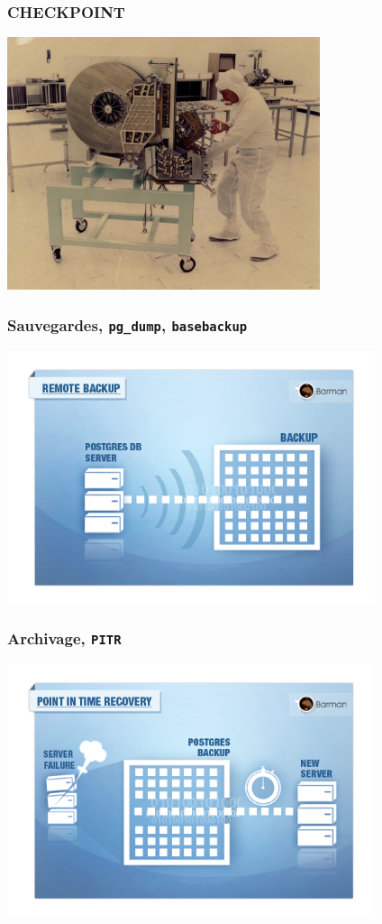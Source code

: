 \documentclass{beamer}
\begin{document}
\begin{frame}[fragile]
\begin{center}
  \frametitle{CHECKPOINT}
  \includegraphics[height=20em]{new_hard_drive.jpg}
\end{center}
\end{frame}

\begin{frame}[fragile]
\begin{center}
  \frametitle{Sauvegardes, \texttt{pg\_dump}, \texttt{basebackup}}

  \includegraphics[height=20em]{barman.png}
\end{center}
\end{frame}

\begin{frame}[fragile]
\begin{center}
  \frametitle{Archivage, \texttt{PITR}}

  \includegraphics[height=20em]{barman-pitr.png}
\end{center}
\end{frame}
\end{document}

